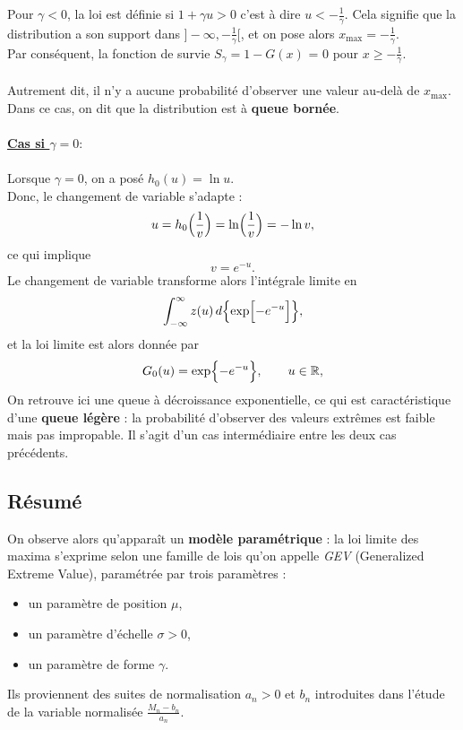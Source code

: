 \documentclass{article}
\theoremstyle{plain}
\theoremstyle{definition}
\theoremstyle{plain}
\begin{document}
Pour \(\gamma < 0\), la loi est définie si $1 + \gamma u > 0$ c'est à dire $u < - \frac{1}{\gamma}$. Cela signifie que la distribution a son support dans \(]-\infty, - \frac{1}{\gamma} [ \), et on pose alors \(x_{\max} = - \frac{1}{\gamma} \).
\\
Par conséquent, la fonction de survie $S_{\gamma} = 1 - G(x)$ = 0 pour \(x \ge - \frac{1}{\gamma} \).
\\
\\
Autrement dit, il n'y a aucune probabilité d'observer une valeur au-delà de \(x_{\max}\). Dans ce cas, on dit que la distribution est à \textbf{queue bornée}.
\\
\\
\textbf{\underline{Cas si \(\gamma=0 : \)}}
\\
\\
Lorsque \(\gamma = 0\), on a posé $h_0(u)=\ln u$.
\\
Donc, le changement de variable s'adapte : 
\[
u=h_0\Bigl(\frac{1}{v}\Bigr)=\ln\Bigl(\frac{1}{v}\Bigr)=-\ln v,
\]
ce qui implique
\[
v=e^{-u}.
\]
Le changement de variable transforme alors l'intégrale limite en
\[
\int_{-\infty}^{\infty} z(u)\,d\Bigl\{\exp\Bigl[-e^{-u}\Bigr]\Bigr\},
\]
et la loi limite est alors donnée par
\[
G_0(u)=\exp\Bigl\{-e^{-u}\Bigr\},\qquad u\in\mathbb{R},
\]
On retrouve ici une queue à décroissance exponentielle, ce qui est caractéristique d'une \textbf{queue légère} : la probabilité d'observer des valeurs extrêmes est faible mais pas impropable.
Il s'agit d'un cas intermédiaire entre les deux cas précédents.
\\
\subsection{Résumé}
On observe alors qu’apparaît un \textbf{modèle paramétrique} : la loi limite des maxima s’exprime selon une famille de lois qu’on appelle \emph{GEV} (Generalized Extreme Value), paramétrée par trois paramètres :

\begin{itemize}
  \item un paramètre de position $\mu$,
  \item un paramètre d’échelle $\sigma > 0$,
  \item un paramètre de forme $\gamma$.
\end{itemize}

Ils proviennent des suites de normalisation $a_n > 0$ et $b_n$ introduites dans l’étude de la variable normalisée \(\frac{M_n - b_n}{a_n}\). 
\end{document}
